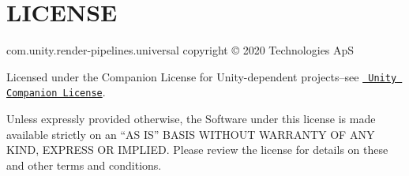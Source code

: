 \chapter{LICENSE}
\hypertarget{md__hey_tea_9_2_library_2_package_cache_2com_8unity_8render-pipelines_8universal_0d14_80_88_2_l_i_c_e_n_s_e}{}\label{md__hey_tea_9_2_library_2_package_cache_2com_8unity_8render-pipelines_8universal_0d14_80_88_2_l_i_c_e_n_s_e}
com.\+unity.\+render-\/pipelines.\+universal copyright © 2020  Technologies ApS

Licensed under the  Companion License for Unity-\/dependent projects--see \href{http://www.unity3d.com/legal/licenses/Unity_Companion_License}{\texttt{ Unity Companion License}}.

Unless expressly provided otherwise, the Software under this license is made available strictly on an “\+AS IS” BASIS WITHOUT WARRANTY OF ANY KIND, EXPRESS OR IMPLIED. Please review the license for details on these and other terms and conditions. 